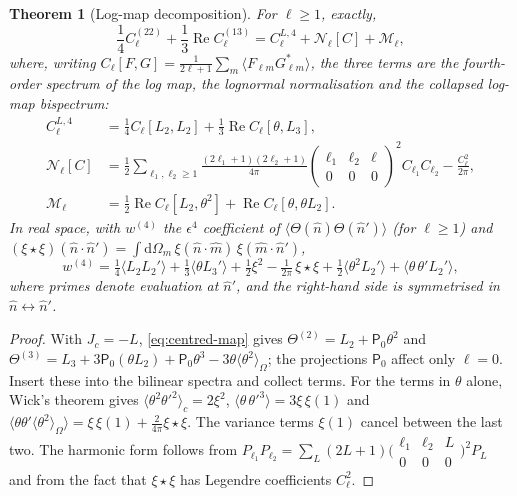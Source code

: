 \documentclass[11pt]{article}
\newtheorem{theorem}{Theorem}
\theoremstyle{definition}
\theoremstyle{remark}
\newcommand{\eps}{\epsilon}
\newcommand{\nh}{\hat n}
\newcommand{\dd}{\mathrm{d}}
\newcommand{\sky}[1]{\langle #1\rangle_{\Omega}}
\newcommand{\ens}[1]{\langle #1\rangle}
\begin{document}
\begin{theorem}[Log-map decomposition]\label{thm:logmap}
For $\ell\ge1$, exactly,
\begin{equation}\label{eq:logmap-decomposition}
\boxed{\frac14C^{(22)}_\ell+\frac13\operatorname{Re}C^{(13)}_\ell
=C^{L,4}_\ell+\mathcal N_\ell[C]+\mathcal M_\ell,}
\end{equation}
where, writing $C_\ell[F,G]=\frac1{2\ell+1}\sum_m\ens{F_{\ell m}G^*_{\ell m}}$, the three
terms are the fourth-order spectrum of the log map, the lognormal normalisation and the
collapsed log-map bispectrum:
\begin{align}
C^{L,4}_\ell&=\tfrac14C_\ell[L_2,L_2]+\tfrac13\operatorname{Re}C_\ell[\theta,L_3],\\
\mathcal N_\ell[C]&=\frac12\sum_{\ell_1,\ell_2\ge1}\frac{(2\ell_1+1)(2\ell_2+1)}{4\pi}
\begin{pmatrix}\ell_1&\ell_2&\ell\\0&0&0\end{pmatrix}^{\!2}C_{\ell_1}C_{\ell_2}
-\frac{C_\ell^2}{2\pi},\label{eq:lognormal-term}\\
\mathcal M_\ell&=\tfrac12\operatorname{Re}C_\ell[L_2,\theta^2]+\operatorname{Re}C_\ell[\theta,\theta L_2].
\end{align}
In real space, with $w^{(4)}$ the $\eps^4$ coefficient of $\ens{\Theta(\nh)\Theta(\nh')}$ (for
$\ell\ge1$) and $(\xi\star\xi)(\nh\cdot\nh')=\int\dd\Omega_m\,\xi(\nh\cdot\hat m)\,\xi(\hat m\cdot\nh')$,
\begin{equation}\label{eq:logmap-realspace}
w^{(4)}=\tfrac14\ens{L_2L_2'}+\tfrac13\ens{\theta L_3'}
+\tfrac12\xi^2-\tfrac1{2\pi}\,\xi\star\xi
+\tfrac12\ens{\theta^2L_2'}+\ens{\theta\,\theta'L_2'},
\end{equation}
where primes denote evaluation at $\nh'$, and the right-hand side is symmetrised in
$\nh\leftrightarrow\nh'$.
\end{theorem}
\begin{proof}
With $J_c=-L$, \eqref{eq:centred-map} gives $\Theta^{(2)}=L_2+\mathsf P_0\theta^2$ and
$\Theta^{(3)}=L_3+3\mathsf P_0(\theta L_2)+\mathsf P_0\theta^3-3\theta\sky{\theta^2}$; the
projections $\mathsf P_0$ affect only $\ell=0$. Insert these into the bilinear spectra and
collect terms. For the terms in $\theta$ alone, Wick's theorem gives
$\ens{\theta^2\theta'^2}_c=2\xi^2$, $\ens{\theta\,\theta'^3}=3\xi\,\xi(1)$ and
$\ens{\theta\theta'\sky{\theta^2}}=\xi\,\xi(1)+\frac2{4\pi}\xi\star\xi$. The variance terms
$\xi(1)$ cancel between the last two. The harmonic form follows from
$P_{\ell_1}P_{\ell_2}=\sum_L(2L+1)\big(\begin{smallmatrix}\ell_1&\ell_2&L\\0&0&0\end{smallmatrix}\big)^2P_L$
and from the fact that $\xi\star\xi$ has Legendre coefficients $C_\ell^2$.
\end{proof}
\end{document}
